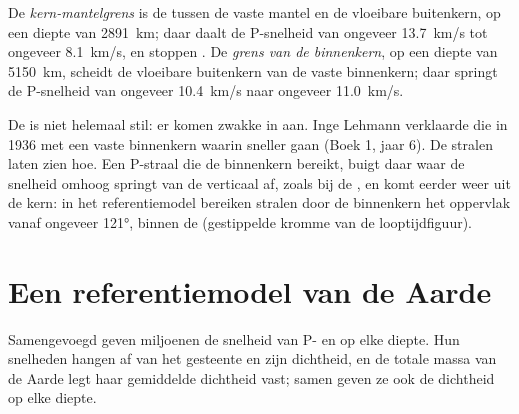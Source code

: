 \begin{definition}\label{def:g11:seismic-structure:core}
De \emph{kern-mantelgrens} is de 
tussen de vaste mantel en de vloeibare buitenkern, op een diepte van
\qty{2891}{km}; daar daalt de P-snelheid van ongeveer \qty{13.7}{km/s} tot
ongeveer \qty{8.1}{km/s}, en stoppen . De \emph{grens van de
binnenkern}, op een diepte van \qty{5150}{km},
scheidt de vloeibare buitenkern van de vaste binnenkern; daar springt de
P-snelheid van ongeveer \qty{10.4}{km/s} naar ongeveer \qty{11.0}{km/s}.
\end{definition}

De  is niet helemaal stil: er komen zwakke  in aan. Inge
Lehmann verklaarde die in 1936 met een vaste binnenkern waarin  sneller
gaan (Boek 1, jaar 6). De stralen laten zien hoe. Een P-straal die de binnenkern
bereikt, buigt daar waar de snelheid omhoog springt van de verticaal af, zoals bij
de , en komt eerder weer uit de kern: in het referentiemodel bereiken stralen
door de binnenkern het oppervlak vanaf ongeveer \ang{121}, binnen de 
(gestippelde kromme van de looptijdfiguur).

\section{Een referentiemodel van de Aarde}\label{sec:g11:seismic-structure:model}

Samengevoegd geven miljoenen  de snelheid van P- en  op elke
diepte. Hun snelheden hangen af van het gesteente en zijn dichtheid, en de totale
massa van de Aarde legt haar gemiddelde dichtheid vast; samen geven ze ook de
dichtheid op elke diepte.

